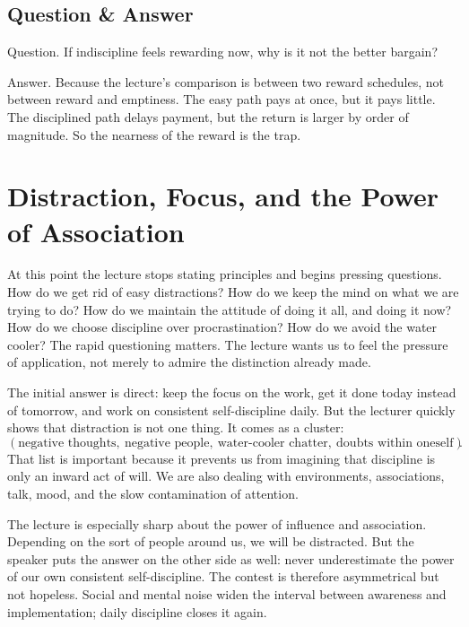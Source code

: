 \subsection{Question \& Answer}

Question. If indiscipline feels rewarding now, why is it not the better bargain?

Answer. Because the lecture's comparison is between two reward schedules, not between reward and emptiness. The easy path pays at once, but it pays little. The disciplined path delays payment, but the return is larger by order of magnitude. So the nearness of the reward is the trap.

\section{Distraction, Focus, and the Power of Association}

At this point the lecture stops stating principles and begins pressing questions. How do we get rid of easy distractions? How do we keep the mind on what we are trying to do? How do we maintain the attitude of doing it all, and doing it now? How do we choose discipline over procrastination? How do we avoid the water cooler? The rapid questioning matters. The lecture wants us to feel the pressure of application, not merely to admire the distinction already made.

The initial answer is direct: keep the focus on the work, get it done today instead of tomorrow, and work on consistent self-discipline daily. But the lecturer quickly shows that distraction is not one thing. It comes as a cluster:
\begin{equation}
(\text{negative thoughts},\ \text{negative people},\ \text{water-cooler chatter},\ \text{doubts within oneself}).
\end{equation}
That list is important because it prevents us from imagining that discipline is only an inward act of will. We are also dealing with environments, associations, talk, mood, and the slow contamination of attention.

The lecture is especially sharp about the power of influence and association. Depending on the sort of people around us, we will be distracted. But the speaker puts the answer on the other side as well: never underestimate the power of our own consistent self-discipline. The contest is therefore asymmetrical but not hopeless. Social and mental noise widen the interval between awareness and implementation; daily discipline closes it again.

